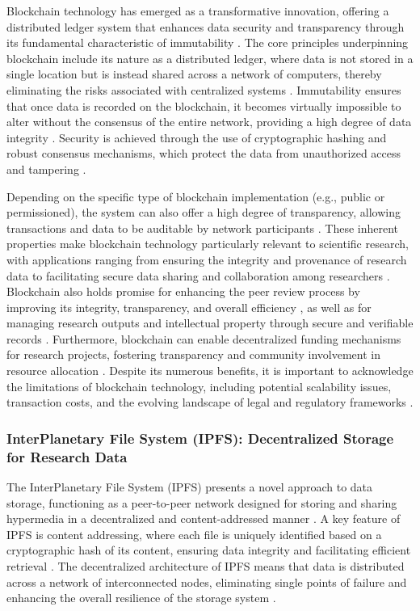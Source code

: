 \documentclass{article}
\begin{document}
Blockchain technology has emerged as a transformative innovation, offering a distributed ledger system that enhances data security and transparency through its fundamental characteristic of immutability \cite{bartling2014opening}. The core principles underpinning blockchain include its nature as a distributed ledger, where data is not stored in a single location but is instead shared across a network of computers, thereby eliminating the risks associated with centralized systems \cite{cachin2017blockchain}. Immutability ensures that once data is recorded on the blockchain, it becomes virtually impossible to alter without the consensus of the entire network, providing a high degree of data integrity \cite{bartling2014opening}. Security is achieved through the use of cryptographic hashing and robust consensus mechanisms, which protect the data from unauthorized access and tampering \cite{bartling2014opening}.

Depending on the specific type of blockchain implementation (e.g., public or permissioned), the system can also offer a high degree of transparency, allowing transactions and data to be auditable by network participants \cite{bartling2014opening}. These inherent properties make blockchain technology particularly relevant to scientific research, with applications ranging from ensuring the integrity and provenance of research data \cite{bartling2014opening} to facilitating secure data sharing and collaboration among researchers \cite{bartling2014opening}. Blockchain also holds promise for enhancing the peer review process by improving its integrity, transparency, and overall efficiency \cite{noothigattu2018trust}, as well as for managing research outputs and intellectual property through secure and verifiable records \cite{vandrouschka2020decentralized}. Furthermore, blockchain can enable decentralized funding mechanisms for research projects, fostering transparency and community involvement in resource allocation \cite{bartling2014opening}. Despite its numerous benefits, it is important to acknowledge the limitations of blockchain technology, including potential scalability issues, transaction costs, and the evolving landscape of legal and regulatory frameworks \cite{xu2019scaling}.

\subsubsection{InterPlanetary File System (IPFS): Decentralized Storage for Research Data}

The InterPlanetary File System (IPFS) presents a novel approach to data storage, functioning as a peer-to-peer network designed for storing and sharing hypermedia in a decentralized and content-addressed manner \cite{benet2014ipfs}. A key feature of IPFS is content addressing, where each file is uniquely identified based on a cryptographic hash of its content, ensuring data integrity and facilitating efficient retrieval \cite{garay2017content}. The decentralized architecture of IPFS means that data is distributed across a network of interconnected nodes, eliminating single points of failure and enhancing the overall resilience of the storage system \cite{dabek2001wide}.
\end{document}
